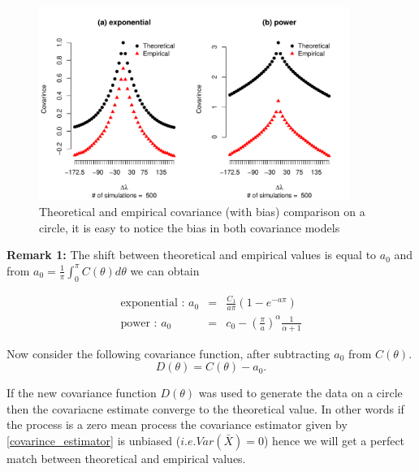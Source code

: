 	      \begin{figure}[H]
	      	\label{covarince_circle}
	      	\centering
	       	\includegraphics[width=0.9\textwidth]{graphs/covarince_circle}
	      	\caption {Theoretical and empirical covariance (with bias) comparison on a circle, it is easy to notice the bias in both covariance models}
	      \end{figure}

	      {\bf Remark 1:} The shift between theoretical and empirical values is equal to $a_0$ and from $a_0 = \frac{1}{\pi}\int_0^\pi C(\theta)d\theta$ we can obtain
	      
\begin{eqnarray*}
	    \mbox{exponential : }  	a_0 &=& \frac{C_1}{a\pi}(1 - e^{-a\pi}) \\
	    \mbox{power : }  	a_0       &=& c_0 - \left(\frac{\pi}{a}\right)^{\alpha}\frac{1}{\alpha + 1}
\end{eqnarray*}

	      Now consider the following covariance function, after subtracting $a_0$ from $C(\theta)$.
	      \[
	      	D(\theta) = C(\theta) - a_0.
	      \]
      
        If the new covariance function $D(\theta)$ was used to generate the data on a circle then the covariacne estimate converge to the theoretical value. In other words if the process is a zero mean process the covariance estimator given by \ref{covarince_estimator} is unbiased ($i.e. Var(\bar{X}) = 0$) hence we will get a perfect match between theoretical and empirical values.
        
	      	      
